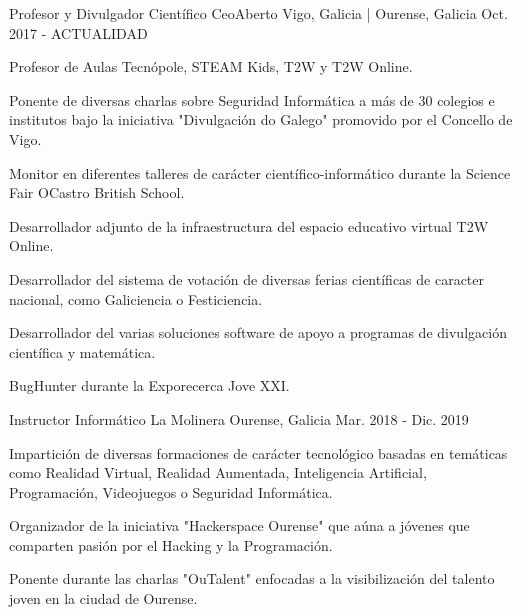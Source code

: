 \documentclass[11pt, a4paper]{style}
\begin{document}
\begin{cventries}
    \vspace{0.1cm}
  \cventry
    {Profesor y Divulgador Científico} %
    {CeoAberto} %
    {Vigo, Galicia | Ourense, Galicia} %
    {Oct. 2017 - ACTUALIDAD} %
    {
      \begin{cvitems} %
        \item {Profesor de Aulas Tecnópole, STEAM Kids, T2W y T2W Online.}
        \item {Ponente de diversas charlas sobre Seguridad Informática a más de 30 colegios e institutos bajo la iniciativa "Divulgación do Galego" promovido por el Concello de Vigo.}
        \item {Monitor en diferentes talleres de carácter científico-informático durante la Science Fair OCastro British School.}
        \item {Desarrollador adjunto de la infraestructura del espacio educativo virtual T2W Online.}
        \item {Desarrollador del sistema de votación de diversas ferias científicas de caracter nacional, como Galiciencia o Festiciencia.}
        \item {Desarrollador del varias soluciones software de apoyo a programas de divulgación científica y matemática.}
        \item {BugHunter durante la Exporecerca Jove XXI.}
      \end{cvitems}
    }
    \vspace{0.1cm}
  \cventry
    {Instructor Informático} %
    {La Molinera} %
    {Ourense, Galicia} %
    {Mar. 2018 - Dic. 2019} %
    {
      \begin{cvitems} %
        \item {Impartición de diversas formaciones de carácter tecnológico basadas en temáticas como Realidad Virtual, Realidad Aumentada, Inteligencia Artificial, Programación, Videojuegos o Seguridad Informática.}
        \item {Organizador de la iniciativa "Hackerspace Ourense" que aúna a jóvenes que comparten pasión por el Hacking y la Programación.}
        \item {Ponente durante las charlas "OuTalent" enfocadas a la visibilización del talento joven en la ciudad de Ourense.}

\end{cvitems}}
\end{cventries}
\end{document}
